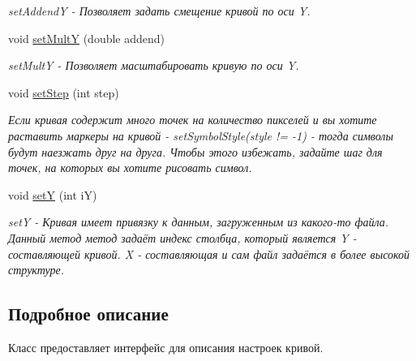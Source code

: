 \begin{DoxyCompactItemize}
\begin{DoxyCompactList}\small\item\em set\-Addend\-Y -\/ Позволяет задать смещение кривой по оси \-Y. \end{DoxyCompactList}\item 
\hypertarget{classCurveProCreator_a3881b8bbfddabf56538c58928347418f}{void \hyperlink{classCurveProCreator_a3881b8bbfddabf56538c58928347418f}{set\-Mult\-Y} (double addend)}\label{classCurveProCreator_a3881b8bbfddabf56538c58928347418f}

\begin{DoxyCompactList}\small\item\em set\-Mult\-Y -\/ Позволяет масштабировать кривую по оси \-Y. \end{DoxyCompactList}\item 
\hypertarget{classCurveProCreator_ad385e385cce634ab07c33a1cc6b9d0ba}{void \hyperlink{classCurveProCreator_ad385e385cce634ab07c33a1cc6b9d0ba}{set\-Step} (int step)}\label{classCurveProCreator_ad385e385cce634ab07c33a1cc6b9d0ba}

\begin{DoxyCompactList}\small\item\em Если кривая содержит много точек на количество пикселей и вы хотите раставить маркеры на кривой -\/ set\-Symbol\-Style(style != -\/1) -\/ тогда символы будут наезжать друг на друга. Чтобы этого избежать, задайте шаг для точек, на которых вы хотите рисовать символ. \end{DoxyCompactList}\item 
\hypertarget{classCurveProCreator_af512caf8250b70448d6587242b246d66}{void \hyperlink{classCurveProCreator_af512caf8250b70448d6587242b246d66}{set\-Y} (int i\-Y)}\label{classCurveProCreator_af512caf8250b70448d6587242b246d66}

\begin{DoxyCompactList}\small\item\em set\-Y -\/ Кривая имеет привязку к данным, загруженным из какого-\/то файла. Данный метод метод задаёт индекс столбца, который является \-Y -\/ составляющей кривой. \-X -\/ составляющая и сам файл задаётся в более высокой структуре. \end{DoxyCompactList}\end{DoxyCompactItemize}


\subsection{Подробное описание}
Класс предоставляет интерфейс для описания настроек кривой. 

